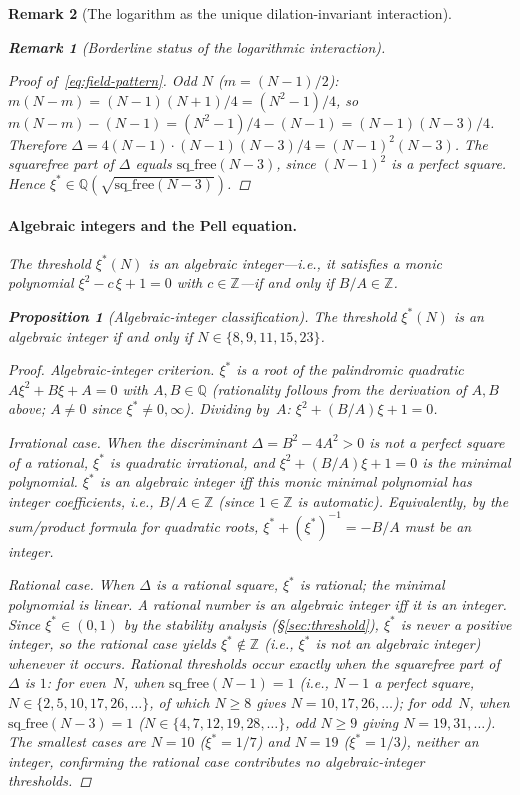 \documentclass[12pt, a4paper]{article}
\newtheorem{proposition}[theorem]{Proposition}
\newtheorem{remark}{Remark}[section]
\numberwithin{equation}{section}
\begin{document}
\begin{remark}[The logarithm as the unique dilation-invariant interaction]
\begin{remark}[Borderline status of the logarithmic interaction]
\begin{proof}[Proof of~\eqref{eq:field-pattern}]
\emph{Odd $N$ ($m = (N{-}1)/2$):}
$m(N{-}m) = (N{-}1)(N{+}1)/4 = (N^2{-}1)/4$, so
$m(N{-}m) - (N{-}1) = (N^2{-}1)/4 - (N{-}1) = (N{-}1)(N{-}3)/4$.
Therefore
$\Delta = 4(N{-}1) \cdot (N{-}1)(N{-}3)/4 = (N{-}1)^2(N{-}3)$.
The squarefree part of $\Delta$ equals
$\mathrm{sq\_free}(N{-}3)$, since $(N{-}1)^2$ is a perfect square.
Hence $\xi^* \in \mathbb{Q}(\sqrt{\mathrm{sq\_free}(N{-}3)})$.
\end{proof}

\paragraph{Algebraic integers and the Pell equation.}
The threshold $\xi^*(N)$ is an algebraic integer---i.e., it
satisfies a \emph{monic} polynomial $\xi^2 - c\,\xi + 1 = 0$ with
$c \in \mathbb{Z}$---if and only if $B/A \in \mathbb{Z}$.

\begin{proposition}[Algebraic-integer classification]
\label{prop:alg-int}
The threshold $\xi^*(N)$ is an algebraic integer if and only if
$N \in \{8, 9, 11, 15, 23\}$.
\end{proposition}

\begin{proof}
\emph{Algebraic-integer criterion.}
$\xi^*$ is a root of the palindromic quadratic
$A\xi^2 + B\xi + A = 0$ with $A, B \in \mathbb{Q}$
(rationality follows from the derivation of $A, B$ above;
$A \ne 0$ since $\xi^* \ne 0, \infty$).
Dividing by~$A$: $\xi^2 + (B/A)\xi + 1 = 0$.

\emph{Irrational case.}
When the discriminant $\Delta = B^2 - 4A^2 > 0$ is not a perfect
square of a rational, $\xi^*$ is quadratic irrational, and
$\xi^2 + (B/A)\xi + 1 = 0$ is \emph{the} minimal polynomial.
$\xi^*$ is an algebraic integer iff this monic minimal polynomial
has integer coefficients, i.e., $B/A \in \mathbb{Z}$ (since
$1 \in \mathbb{Z}$ is automatic).  Equivalently, by the sum/product
formula for quadratic roots,
$\xi^* + (\xi^*)^{-1} = -B/A$ must be an integer.

\emph{Rational case.}
When $\Delta$ is a rational square, $\xi^*$ is rational; the
minimal polynomial is linear.  A rational number is an algebraic
integer iff it is an integer.  Since $\xi^* \in (0, 1)$ by the
stability analysis (\S\ref{sec:threshold}), $\xi^*$ is never a
positive integer, so the rational case yields
$\xi^*\not\in\mathbb{Z}$ (i.e., $\xi^*$ is not an algebraic integer)
whenever it occurs.  Rational thresholds occur exactly when the
squarefree part of $\Delta$ is $1$: for even~$N$, when
$\mathrm{sq\_free}(N{-}1) = 1$ (i.e., $N{-}1$ a perfect square,
$N \in \{2, 5, 10, 17, 26, \ldots\}$, of which $N \ge 8$ gives
$N = 10, 17, 26, \ldots$); for odd~$N$, when
$\mathrm{sq\_free}(N{-}3) = 1$ ($N \in \{4, 7, 12, 19, 28, \ldots\}$,
odd $N \ge 9$ giving $N = 19, 31, \ldots$).  The smallest cases
are $N = 10$ ($\xi^* = 1/7$) and $N = 19$ ($\xi^* = 1/3$), neither
an integer, confirming the rational case contributes no
algebraic-integer thresholds.


\end{proof}
\end{remark}
\end{remark}
\end{document}
